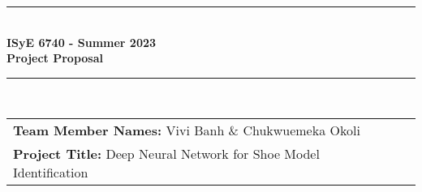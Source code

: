 \documentclass{article}
\begin{document}
\begin{titlepage}
	\clearpage\thispagestyle{empty}
	\centering
	\vspace{1cm}
		
	\rule{\linewidth}{1mm} \\[0.5cm]
	{ \Large \bfseries ISyE 6740 - Summer 2023\\[0.2cm]
		Project Proposal}\\[0.5cm]
	\rule{\linewidth}{1mm} \\[1cm]

		\begin{tabular}{l p{5cm}}
		\textbf{Team Member Names:} Vivi Banh \& Chukwuemeka Okoli \\[10pt]
		\textbf{Project Title:} Deep Neural Network for Shoe Model Identification  \\[10pt]
		\end{tabular} 

\end{titlepage}	
	
	\pagebreak
\end{document}
